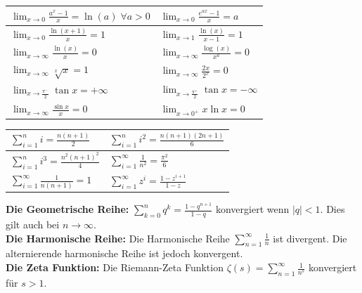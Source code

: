 \begin{center}
\begin{tabular}{ | l | l | }
                 \hline
                $\lim_{x \to 0} \frac{a^x - 1}{x} = \ln(a) \; \forall a > 0$ & $\lim_{x \to 0} \frac{e^{ax} - 1}{x} = a$ \\
                 \hline
                $\lim_{x \to 0} \frac{\ln(x + 1)}{x} = 1$ & $\lim_{x \to 1} \frac{\ln(x)}{x - 1} = 1$ \\
                 \hline
                $\lim_{x \to \infty} \frac{\ln(x)}{x} = 0$ & $\lim_{x \to \infty} \frac{\log(x)}{x^a} = 0$ \\
                 \hline
                $\lim_{x \to \infty} \sqrt[x]{x} = 1$ & $\lim_{x \to \infty} \frac{2x}{2^x} = 0$ \\
                 \hline 
                $\lim_{x \to \frac{\pi^-}{2}} \tan{x} = +\infty$ & $\lim_{x \to \frac{\pi^+}{2}} \tan{x} = -\infty$ \\
                \hline
                $\lim_{x \to \infty} \frac{\sin{x}}{x} = 0$ &  $\lim_{x \to 0^+} x\ln{x} = 0$\\
                \hline  
	\end{tabular}
\end{center}
\egroup



\bgroup
\def\arraystretch{2}
\begin{center}
	\begin{tabular}{ | l | l | }
		 \hline
	 	$\sum_{i = 1}^{n} i = \frac{n(n+1)}{2}$ & $\sum_{i=1}^{n} i^2 = \frac{n(n+1)(2n+1)}{6}$ \\
		 \hline 
	 	$\sum_{i=1}^{n} i^3 = \frac{n^2(n+1)^2}{4}$ & $\sum_{i = 1}^{\infty} \frac{1}{n^2} = \frac{\pi^2}{6}$ \\
		 \hline  
	 	$\sum_{i = 1}^{\infty} \frac{1}{n(n+1)} = 1$ & $\sum_{i = 1}^\infty z^i = \frac{1 - z^{i + 1}}{1 - z}$ \\
		 \hline   
	\end{tabular}
\end{center}
\egroup

\textbf{Die Geometrische Reihe:}
$\sum_{k=0}^{n} q^k = \frac{1 - q^{n+1}}{1 - q}$ konvergiert wenn $|q| < 1$. Dies gilt auch bei 
$n \to \infty$. \medskip \\

\textbf{Die Harmonische Reihe:}
Die Harmonische Reihe $\sum_{n = 1}^{\infty} \frac{1}{n}$ ist divergent. Die alternierende harmonische
Reihe ist jedoch konvergent. \medskip \\

\textbf{Die Zeta Funktion:}
Die Riemann-Zeta Funktion $\zeta(s) = \sum_{n = 1}^\infty \frac{1}{n^s}$ konvergiert für $s > 1$. \medskip \\


